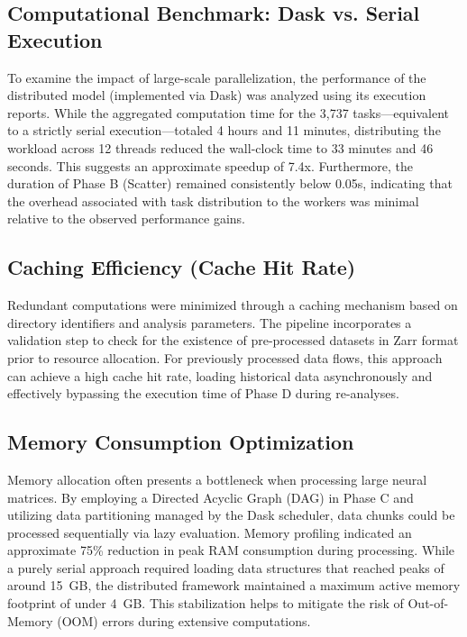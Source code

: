 \subsection{Computational Benchmark: Dask vs. Serial Execution}

To examine the impact of large-scale parallelization, the performance of the distributed model (implemented via Dask) was analyzed using its execution reports. While the aggregated computation time for the 3,737 tasks---equivalent to a strictly serial execution---totaled 4 hours and 11 minutes, distributing the workload across 12 threads reduced the wall-clock time to 33 minutes and 46 seconds. This suggests an approximate speedup of 7.4x. Furthermore, the duration of Phase B (Scatter) remained consistently below 0.05s, indicating that the overhead associated with task distribution to the workers was minimal relative to the observed performance gains.

\subsection{Caching Efficiency (Cache Hit Rate)}

Redundant computations were minimized through a caching mechanism based on directory identifiers and analysis parameters. The pipeline incorporates a validation step to check for the existence of pre-processed datasets in Zarr format prior to resource allocation. For previously processed data flows, this approach can achieve a high cache hit rate, loading historical data asynchronously and effectively bypassing the execution time of Phase D during re-analyses.

\subsection{Memory Consumption Optimization}

Memory allocation often presents a bottleneck when processing large neural matrices. By employing a Directed Acyclic Graph (DAG) in Phase C and utilizing data partitioning managed by the Dask scheduler, data chunks could be processed sequentially via lazy evaluation. Memory profiling indicated an approximate 75\% reduction in peak RAM consumption during processing. While a purely serial approach required loading data structures that reached peaks of around 15~GB, the distributed framework maintained a maximum active memory footprint of under 4~GB. This stabilization helps to mitigate the risk of Out-of-Memory (OOM) errors during extensive computations.

